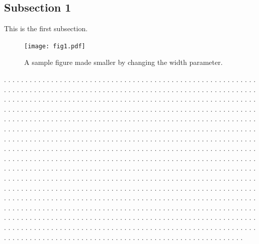 \documentclass[twocolumn]{revtex4}
\begin{document}
\subsection{Subsection 1}

This is the first subsection.
\begin{figure}[h!]
\centering
\texttt{[image: fig1.pdf]}
\caption{A sample figure made smaller by changing the width parameter.}
\label{fig:small_sample}
\end{figure}



\vspace*{0.5cm}
\noindent
. . . . . . . . . . . . . . . . . . . . . . . . . . . . . . . . . . . . . . . .
. . . . . . . . . . . . . . . . . . . . . . . . . . . . . . . . . . . . . . . .
. . . . . . . . . . . . . . . . . . . . . . . . . . . . . . . . . . . . . . . .
. . . . . . . . . . . . . . . . . . . . . . . . . . . . . . . . . . . . . . . .
. . . . . . . . . . . . . . . . . . . . . . . . . . . . . . . . . . . . . . . .
. . . . . . . . . . . . . . . . . . . . . . . . . . . . . . . . . . . . . . . .
. . . . . . . . . . . . . . . . . . . . . . . . . . . . . . . . . . . . . . . .
. . . . . . . . . . . . . . . . . . . . . . . . . . . . . . . . . . . . . . . .
. . . . . . . . . . . . . . . . . . . . . . . . . . . . . . . . . . . . . . . .
. . . . . . . . . . . . . . . . . . . . . . . . . . . . . . . . . . . . . . . .
. . . . . . . . . . . . . . . . . . . . . . . . . . . . . . . . . . . . . . . .
. . . . . . . . . . . . . . . . . . . . . . . . . . . . . . . . . . . . . . . .
. . . . . . . . . . . . . . . . . . . . . . . . . . . . . . . . . . . . . . . .
. . . . . . . . . . . . . . . . . . . . . . . . . . . . . . . . . . . . . . . .
. . . . . . . . . . . . . . . . . . . . . . . . . . . . . . . . . . . . . . . .
. . . . . . . . . . . . . . . . . . . . . . . . . . . . . . . . . . . . . . . .
. . . . . . . . . . . . . . . . . . . . . . . . . . . . . . . . . . . . . . . .
. . . . . . . . . . . . . . . . . . . . . . . . . . . . . . . . . . . . . . . .
. . . . . . . . . . . . . . . . . . . . . . . . . . . . . . . . . . . . . . . .
. . . . . . . . . . . . . . . . . . . . . . . . . . . . . . . . . . . . . . . .
. . . . . . . . . . . . . . . . . . . . . . . . . . . . . . . . . . . . . . . .
. . . . . . . . . . . . . . . . . . . . . . . . . . . . . . . . . . . . . . . .
. . . . . . . . . . . . . . . . . . . . . . . . . . . . . . . . . . . . . . . .
. . . . . . . . . . . . . . . . . . . . . . . . . . . . . . . . . . . . . . . .
. . . . . . . . . . . . . . . . . . . . . . . . . . . . . . . . . . . . . . . .
\end{document}
